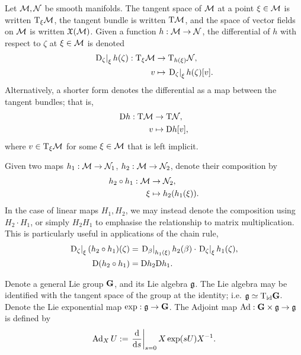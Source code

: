 \documentclass{article}
\newcommand\at[2]{\left.#1\right|_{#2}}
\newcommand{\dds}{\frac{\td}{\td s}}
\begin{document}
Let $\mathcal{M}, \mathcal{N}$ be smooth manifolds.
The tangent space of $\mathcal{M}$ at a point $\xi \in \mathcal{M}$ is written $\mathrm{T}_\xi \mathcal{M}$, the tangent bundle is written $\mathrm{T} \mathcal{M}$, and the space of vector fields on $\mathcal{M}$ is written $\mathfrak{X}(\mathcal{M})$.
Given a function $h: \mathcal{M} \to \mathcal{N}$, the differential of $h$ with respect to $\zeta$ at $\xi \in \mathcal{M}$ is denoted
\begin{align*}
    \at{\tD_\zeta}{\xi} h(\zeta) : \tT_\xi \calM &\to \tT_{h(\xi)} \calN, \\
    v &\mapsto \at{\tD_\zeta}{\xi} h(\zeta)[v].
\end{align*}
Alternatively, a shorter form denotes the differential as a map between the tangent bundles; that is,
\begin{align*}
    \mathrm{D} h : \mathrm{T} \mathcal{M} &\to \mathrm{T} \mathcal{N}, \\
    v &\mapsto \mathrm{D} h [v],
\end{align*}
where $v \in \mathrm{T}_\xi \mathcal{M}$ for some $\xi \in \mathcal{M}$ that is left implicit.

Given two maps $h_1 : \mathcal{M} \to \mathcal{N}_1$, $h_2 : \mathcal{M} \to \mathcal{N}_2$, denote their composition by
\begin{align*}
    h_2 \circ h_1 : \mathcal{M} &\to \mathcal{N}_2, \\
    \xi &\mapsto h_2(h_1(\xi)).
\end{align*}
In the case of linear maps $H_1, H_2$, we may instead denote the composition using $H_2 \cdot H_1$, or simply $H_2 H_1$ to emphasise the relationship to matrix multiplication.
This is particularly useful in applications of the chain rule,
\begin{align*}
    \at{\tD_\zeta}{\xi} (h_2 \circ h_1) (\zeta) &= \at{\tD_\beta}{h_1(\xi)} h_2(\beta) \cdot \at{\tD_\zeta}{\xi} h_1(\zeta), \\
    \tD (h_2 \circ h_1) &= \tD h_2 \tD h_1.
\end{align*}

Denote a general Lie group $\mathbf{G}$, and its Lie algebra $\mathfrak{g}$.
The Lie algebra may be identified with the tangent space of the group at the identity; i.e. $\mathfrak{g} \simeq \mathrm{T}_{\mathrm{id}} \mathbf{G}$.
Denote the Lie exponential map $\exp: \mathfrak{g} \to \mathbf{G}$.
The Adjoint map $\operatorname{Ad}: \mathbf{G} \times \mathfrak{g} \to \mathfrak{g}$ is defined by
\begin{align*}
    \Ad_X U := \at{\dds}{s=0} X \exp(s U) X^{-1}.
\end{align*}
\end{document}
